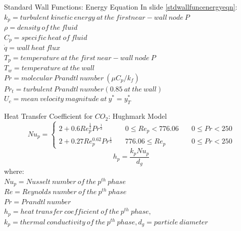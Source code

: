 \begin{frame}{Standard Wall Functions: Energy Equation}
    In slide \ref{stdwallfuncenergyeqn}:\\
    $k_p = turbulent\:kinetic\:energy\:at\:the\:first near-wall\:node\:P$\\
    $\rho = density\:of\:the\:fluid$\\
    $C_p = specific\:heat\:of\:fluid$\\
    $\Dot{q}= wall\:heat\: flux$\\
    $T_p = temperature\:at\:the\:first\:near-wall\:node\:P$\\
    $T_w = temperature\:at\:the\:wall$\\
    $Pr = molecular\:Prandtl\:number\:(\mu C_p/k_f)$\\
    $Pr_t = turbulent\:Prandtl\:number(0.85\:at\:the\:wall)$\\
    $U_c = mean\:velocity\:magnitude\:at\:y^*=y_T^*$
\end{frame}

\begin{frame}{Heat Transfer Coefficient for $CO_2$: Hughmark Model}
    \begin{equation*}
     Nu_p  = \left\{
        \begin{array}{lll}
            2 + 0.6 Re_p^\frac{1}{2} Pr^\frac{1}{3} & \quad 0\leq Re_p < 776.06 & \quad 0\leq Pr < 250 \\
            2 + 0.27 Re_p^{0.62} Pr^\frac{1}{3}  & \quad 776.06\leq Re_p  & \quad 0\leq Pr < 250
        \end{array}
    \right.
    \end{equation*}
    \begin{equation*}
        h_p = \frac{k_p Nu_p}{d_g}
    \end{equation*}
    where:\\
    $Nu_p = Nusselt\:number\:of\:the\:p^{th}\:phase$\\
    $Re = Reynolds\:number\:of\:the\:p^{th}\:phase$\\
    $Pr = Prandtl\:number$\\
    $h_p = heat\:transfer\:coefficient\:of\:the\:p^{th}\:phase,$\\
    $k_p = thermal\:conductivity\:of\:the\:p^{th}\:phase, d_g = particle\:diameter$
\end{frame}